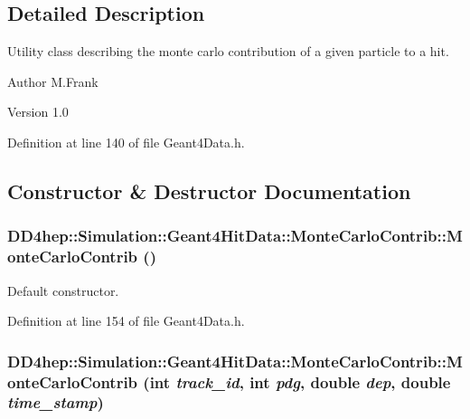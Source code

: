 \subsection{Detailed Description}
Utility class describing the monte carlo contribution of a given particle to a hit. \begin{DoxyAuthor}{Author}
M.Frank 
\end{DoxyAuthor}
\begin{DoxyVersion}{Version}
1.0 
\end{DoxyVersion}


Definition at line 140 of file Geant4Data.h.

\subsection{Constructor \& Destructor Documentation}
\hypertarget{class_d_d4hep_1_1_simulation_1_1_geant4_hit_data_1_1_monte_carlo_contrib_a1c645716d88f4e36bd62b9ad374808ee}{
\subsubsection[{MonteCarloContrib}]{\setlength{\rightskip}{0pt plus 5cm}DD4hep::Simulation::Geant4HitData::MonteCarloContrib::MonteCarloContrib ()}}
\label{class_d_d4hep_1_1_simulation_1_1_geant4_hit_data_1_1_monte_carlo_contrib_a1c645716d88f4e36bd62b9ad374808ee}


Default constructor. 

Definition at line 154 of file Geant4Data.h.\hypertarget{class_d_d4hep_1_1_simulation_1_1_geant4_hit_data_1_1_monte_carlo_contrib_a1ae337705c3b25f0ba9521d4be0b009c}{
\subsubsection[{MonteCarloContrib}]{\setlength{\rightskip}{0pt plus 5cm}DD4hep::Simulation::Geant4HitData::MonteCarloContrib::MonteCarloContrib (int {\em track\_\-id}, \/  int {\em pdg}, \/  double {\em dep}, \/  double {\em time\_\-stamp})}}
\label{class_d_d4hep_1_1_simulation_1_1_geant4_hit_data_1_1_monte_carlo_contrib_a1ae337705c3b25f0ba9521d4be0b009c}


